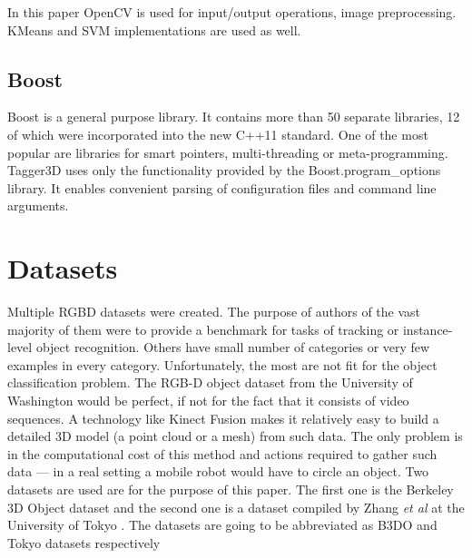 	In this paper OpenCV is used for input/output operations, image preprocessing. KMeans and SVM implementations are used as well.
	
	\subsection{Boost}
	Boost is a general purpose library. It contains more than 50 separate libraries, 12 of which were incorporated into the new C++11 standard. One of the most popular are libraries for smart pointers, multi-threading or meta-programming. Tagger3D uses only the functionality provided by the Boost.program\_options library. It enables convenient parsing of configuration files and command line arguments.
		
\section{Datasets}

	Multiple RGBD datasets were created. The purpose of authors of the vast majority of them were to provide a benchmark for tasks of tracking or instance-level object recognition. Others have small number of categories or very few examples in every category. Unfortunately, the most are not fit for the object classification problem.
	The RGB-D object dataset from the University of Washington \cite{dataset_washington} would be perfect, if not for the fact that it consists of video sequences. A technology like Kinect Fusion \cite{KinectFusion} makes it relatively easy to build a detailed 3D model (a point cloud or a mesh) from such data. The only problem is in the computational cost of this method and actions required to gather such data --- in a real setting a mobile robot would have to circle an object. Two datasets are used are for the purpose of this paper. The first one is the Berkeley 3D Object dataset \cite{B3DO} and the second one is a dataset compiled by Zhang \emph{et al} at the University of Tokyo \cite{zhangcategory}. The datasets are going to be abbreviated as B3DO and Tokyo datasets respectively


